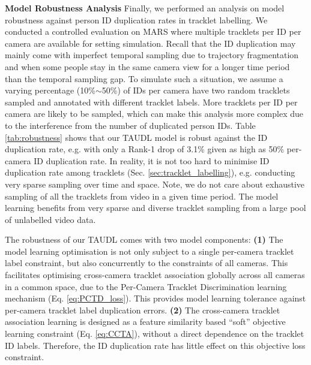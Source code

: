 \documentclass[runningheads]{llncs}
\begin{document}
\noindent \textbf{Model Robustness Analysis } Finally, we performed an analysis
on model robustness against person ID duplication rates in tracklet labelling.
We conducted a controlled evaluation on MARS 
where multiple tracklets per ID per camera are available for 
setting simulation.
Recall that the ID duplication may mainly 
come with imperfect temporal sampling due to trajectory fragmentation
and when some people stay in the same camera view for a longer
time period than the temporal sampling gap.
To simulate such a situation,
we assume a varying percentage (10\%$\sim$50\%) of IDs per camera have
two random tracklets sampled and annotated with different tracklet labels.
More tracklets per ID per camera are likely to be sampled,
which can make this analysis more complex due to 
the interference from the number of duplicated person IDs.
Table \ref{tab:robustness} shows that 
our TAUDL model is robust against the ID duplication rate,
e.g. with only a Rank-1 drop of 3.1\% given 
as high as 50\% per-camera ID duplication rate.
In reality, it is not too hard to minimise ID duplication rate among tracklets
(Sec. \ref{sec:tracklet_labelling}),
e.g. conducting very sparse sampling over time and space. Note, we do
not care about exhaustive sampling of all the tracklets from video in
a given time period. The model learning benefits from very sparse and
diverse tracklet sampling from a large pool of unlabelled video data.

The robustness of our TAUDL comes with two model components:
{\bf (1)} The model learning optimisation is not only subject to
a single per-camera tracklet label constraint,
but also concurrently to the constraints of all cameras.
This facilitates optimising cross-camera 
tracklet association globally across all cameras in a common
space, due to the Per-Camera Tracklet Discrimination learning mechanism
(Eq. \eqref{eq:PCTD_loss}).
This provides model learning tolerance against
per-camera tracklet label duplication errors.
{\bf (2)} The cross-camera tracklet association learning 
is designed as a feature similarity based ``soft'' objective learning
constraint (Eq. \eqref{eq:CCTA}), without a direct dependence on the
tracklet ID labels.
Therefore, the ID duplication rate has little effect on 
this objective loss constraint.
\end{document}
